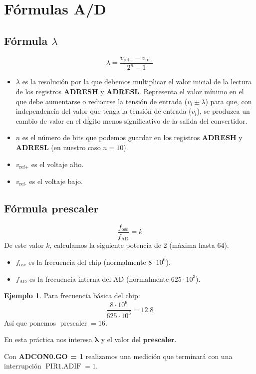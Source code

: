 \documentclass{article}
\theoremstyle{definition} %
\newtheorem{ejemplo}{Ejemplo}[subsection]
\begin{document}
\section{Fórmulas A/D}
\subsection{Fórmula $\lambda$}
\large
\[ \lambda = \frac{v_{\text{ref+}}-v_{\text{ref-}}}{2^n-1} \]
\normalsize
\begin{itemize}
  \item $\lambda$ es la resolución por la que debemos multiplicar el valor inicial de la lectura de los registros \textbf{ADRESH} y \textbf{ADRESL}. Representa el valor mínimo en el que debe aumentarse o reducirse la tensión de entrada ($v_i \pm \lambda$) para que, con independencia del valor que tenga la tensión de entrada ($v_i$), se produzca un cambio de valor en el dígito menos significativo de la salida del convertidor.
  \item $n$ es el número de bits que podemos guardar en los registros  \textbf{ADRESH} y \textbf{ADRESL} (en nuestro caso $n = 10$).
  \item $v_{\text{ref+}}$ es el voltaje alto. 
  \item $v_{\text{ref-}}$ es el voltaje bajo.
\end{itemize}
\subsection{Fórmula $\mathbf{prescaler}$}
\[ \frac{f_{\text{osc}}}{f_{\text{AD}}} = k \]
De este valor $k$, calculamos la siguiente potencia de 2 (máxima hasta 64).
\begin{itemize}
  \item $f_{\text{osc}}$ es la frecuencia del chip (normalmente $8 \cdot 10^6$).
  \item $f_{\text{AD}}$ es la frecuencia interna del AD (normalmente $625 \cdot 10^3$).
\end{itemize}
\begin{ejemplo} Para frecuencia básica del chip:
  \[ \frac{8 \cdot 10^6}{625 \cdot 10^3} = 12.8\]
  Así que ponemos $\operatorname{prescaler} = 16$.
\end{ejemplo}
En esta práctica nos interesa $\boldsymbol{\lambda}$ y el valor del $\mathbf{prescaler}$.

\noindent Con \textbf{ADCON0.GO = 1} realizamos una medición que terminará con una interrupción $\operatorname{PIR1.ADIF} = 1$.
\end{document}
